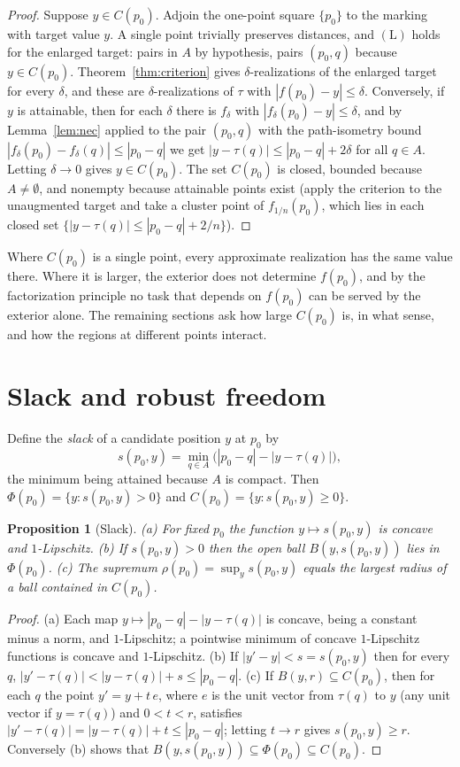 \documentclass[11pt]{article}
\newtheorem{proposition}[theorem]{Proposition}
\theoremstyle{definition}
\theoremstyle{remark}
\begin{document}
\begin{proof}
Suppose $y\in C(p_0)$. Adjoin the one-point square $\{p_0\}$ to the marking with target value $y$. A single point trivially preserves distances, and $(\mathrm L)$ holds for the enlarged target: pairs in $A$ by hypothesis, pairs $(p_0,q)$ because $y\in C(p_0)$. Theorem~\ref{thm:criterion} gives $\delta$-realizations of the enlarged target for every $\delta$, and these are $\delta$-realizations of $\tau$ with $|f(p_0)-y|\le\delta$. Conversely, if $y$ is attainable, then for each $\delta$ there is $f_\delta$ with $|f_\delta(p_0)-y|\le\delta$, and by Lemma~\ref{lem:nec} applied to the pair $(p_0,q)$ with the path-isometry bound $|f_\delta(p_0)-f_\delta(q)|\le|p_0-q|$ we get $|y-\tau(q)|\le|p_0-q|+2\delta$ for all $q\in A$. Letting $\delta\to0$ gives $y\in C(p_0)$. The set $C(p_0)$ is closed, bounded because $A\neq\emptyset$, and nonempty because attainable points exist (apply the criterion to the unaugmented target and take a cluster point of $f_{1/n}(p_0)$, which lies in each closed set $\{|y-\tau(q)|\le|p_0-q|+2/n\}$).
\end{proof}

Where $C(p_0)$ is a single point, every approximate realization has the same value there. Where it is larger, the exterior does not determine $f(p_0)$, and by the factorization principle no task that depends on $f(p_0)$ can be served by the exterior alone. The remaining sections ask how large $C(p_0)$ is, in what sense, and how the regions at different points interact.

\section{Slack and robust freedom}

Define the \emph{slack} of a candidate position $y$ at $p_0$ by
\[
s(p_0,y)=\min_{q\in A}\bigl(|p_0-q|-|y-\tau(q)|\bigr),
\]
the minimum being attained because $A$ is compact. Then $\Phi(p_0)=\{y:s(p_0,y)>0\}$ and $C(p_0)=\{y:s(p_0,y)\ge0\}$.

\begin{proposition}[Slack]\label{prop:slack}
(a) For fixed $p_0$ the function $y\mapsto s(p_0,y)$ is concave and $1$-Lipschitz. (b) If $s(p_0,y)>0$ then the open ball $B(y,s(p_0,y))$ lies in $\Phi(p_0)$. (c) The supremum $\rho(p_0)=\sup_y s(p_0,y)$ equals the largest radius of a ball contained in $C(p_0)$.
\end{proposition}

\begin{proof}
(a) Each map $y\mapsto|p_0-q|-|y-\tau(q)|$ is concave, being a constant minus a norm, and $1$-Lipschitz; a pointwise minimum of concave $1$-Lipschitz functions is concave and $1$-Lipschitz. (b) If $|y'-y|<s=s(p_0,y)$ then for every $q$, $|y'-\tau(q)|<|y-\tau(q)|+s\le|p_0-q|$. (c) If $B(y,r)\subseteq C(p_0)$, then for each $q$ the point $y'=y+t\,e$, where $e$ is the unit vector from $\tau(q)$ to $y$ (any unit vector if $y=\tau(q)$) and $0<t<r$, satisfies $|y'-\tau(q)|=|y-\tau(q)|+t\le|p_0-q|$; letting $t\to r$ gives $s(p_0,y)\ge r$. Conversely (b) shows that $B(y,s(p_0,y))\subseteq\Phi(p_0)\subseteq C(p_0)$.
\end{proof}
\end{document}
